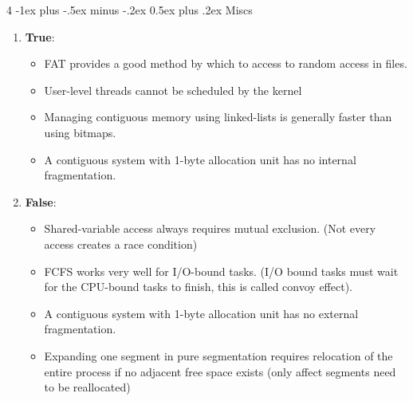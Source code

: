 \documentclass[10pt, landscape]{article}
\makeatletter
\renewcommand{\section}{\@startsection{section}{1}{0mm}%
                                {-1ex plus -.5ex minus -.2ex}%
                                {0.5ex plus .2ex}%
                                {\normalfont\large\bfseries}}
\makeatother
\begin{document}
\begin{multicols}{4}
\section{Miscs}
\begin{enumerate}
    \item \textbf{True}:
    \begin{itemize}
        \item FAT provides a good method by which to  access to random access in files.
        \item User-level threads cannot be scheduled by the kernel
        \item Managing contiguous memory using linked-lists is generally faster than using bitmaps.
        \item A contiguous system with 1-byte allocation unit has no internal fragmentation.
    \end{itemize}
    \item \textbf{False}:
    \begin{itemize}
        \item Shared-variable access always requires mutual exclusion. (Not every access creates a race condition)
        \item FCFS works very well for I/O-bound tasks. (I/O bound tasks must wait for the CPU-bound tasks to finish, this is called convoy effect).
        \item A contiguous system with 1-byte allocation unit has no external fragmentation.
        \item Expanding one segment in pure segmentation requires relocation of the entire process if no adjacent free space exists (only affect segments need to be reallocated)
    \end{itemize}
\end{enumerate}

\end{multicols}

\end{document}
